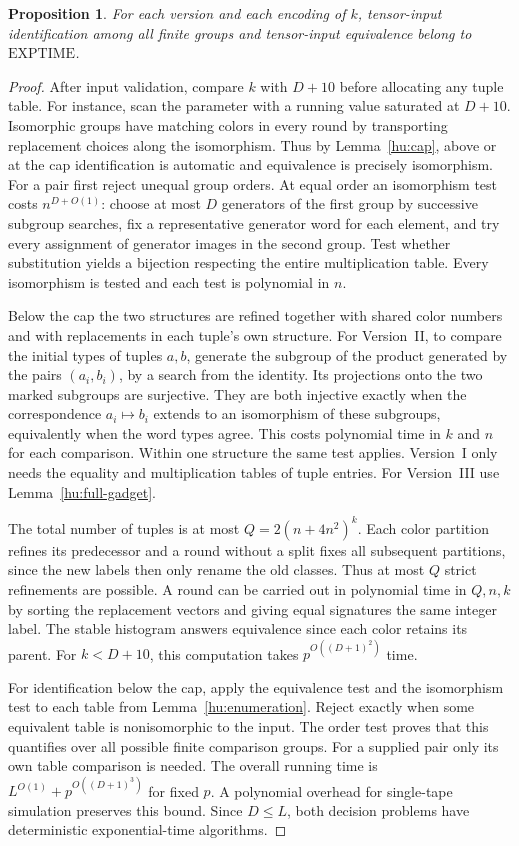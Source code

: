 \documentclass[11pt]{article}
\newtheorem{proposition}[theorem]{Proposition}
\theoremstyle{definition}
\theoremstyle{remark}
\numberwithin{equation}{section}
\begin{document}
\begin{proposition}
\label{hu:membership}
For each version and each encoding of $k$, tensor-input identification
among all finite groups and tensor-input equivalence belong to
$\mathrm{EXPTIME}$.
\end{proposition}
\begin{proof}
After input validation, compare $k$ with $D+10$ before allocating any
tuple table. For instance, scan the parameter with a running value
saturated at $D+10$. Isomorphic groups have matching colors in
every round by transporting replacement choices along the isomorphism.
Thus by Lemma~\ref{hu:cap}, above or at the cap identification is
automatic and equivalence is precisely isomorphism. For a pair first
reject unequal group orders. At equal order an isomorphism test costs
$n^{D+O(1)}$: choose at most $D$ generators of the first group by
successive subgroup searches, fix a representative generator word
for each element, and try every assignment of generator images in
the second group. Test whether substitution yields a bijection
respecting the entire multiplication table. Every isomorphism is
tested and each test is polynomial in $n$.

Below the cap the two structures are refined together with shared
color numbers and with replacements in each tuple's own structure.
For Version~II, to compare the initial types of tuples $a,b$,
generate the subgroup of the product generated by the pairs
$(a_i,b_i)$, by a search from the identity. Its projections onto
the two marked subgroups are surjective. They are both injective
exactly when the correspondence $a_i\mapsto b_i$ extends to an
isomorphism of these subgroups, equivalently when the word types
agree. This costs polynomial time in $k$ and $n$ for each comparison.
Within one structure the same test applies. Version~I only needs
the equality and multiplication tables of tuple entries. For
Version~III use Lemma~\ref{hu:full-gadget}.

The total number of tuples is at most $Q=2(n+4n^2)^k$.
Each color partition refines its predecessor and a round without a
split fixes all subsequent partitions, since the new labels then
only rename the old classes. Thus at most $Q$ strict refinements
are possible. A round can be carried out in polynomial time in
$Q,n,k$ by sorting the replacement vectors and giving equal
signatures the same integer label. The stable histogram answers
equivalence since each color retains its parent. For $k<D+10$,
this computation takes $p^{O((D+1)^2)}$ time.

For identification below the cap, apply the equivalence test and
the isomorphism test to each table from Lemma~\ref{hu:enumeration}.
Reject exactly when some equivalent table is nonisomorphic to the
input. The order test proves that this quantifies over all possible
finite comparison groups. For a supplied pair only its own table
comparison is needed. The overall running time is
$L^{O(1)}+p^{O((D+1)^3)}$ for fixed $p$. A polynomial overhead for
single-tape simulation preserves this bound. Since $D\le L$, both
decision problems have deterministic exponential-time algorithms.
\end{proof}
\end{document}

